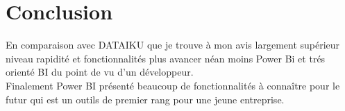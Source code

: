 \documentclass[french,a4paper,11pt,oneside]{book}
\begin{document}
{{{			}
			
			
						
		}

	
		

	}
	\section{Conclusion}{
		En comparaison avec DATAIKU que je trouve à mon avis largement supérieur niveau rapidité et fonctionnalités plus avancer néan moins Power Bi et trés orienté BI du point de vu d'un développeur.\\
		Finalement Power BI présenté beaucoup de fonctionnalités à connaître pour le futur qui est un outils de premier rang pour une jeune entreprise.
	}


	
	
\end{document}
